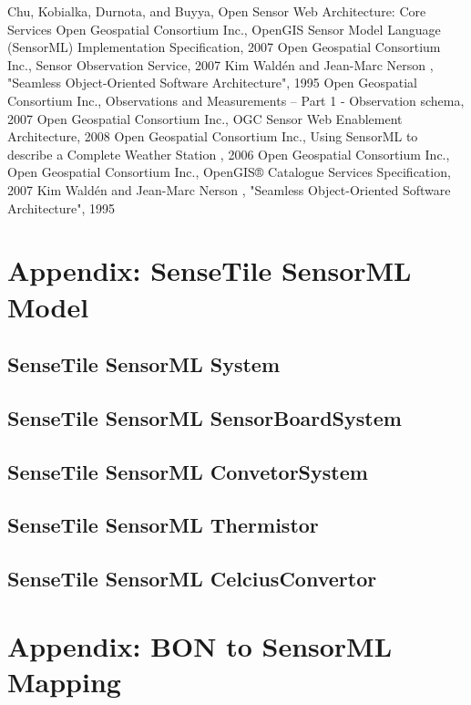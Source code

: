 \documentclass[]{final_report}
\begin{document}
\newpage
\begin{thebibliography}{99}
 Chu, Kobialka,  Durnota, and  Buyya, Open Sensor Web Architecture: Core Services
Open Geospatial Consortium Inc., OpenGIS Sensor Model Language (SensorML) Implementation Specification, 2007
Open Geospatial Consortium Inc.,  Sensor Observation Service, 2007
Kim Waldén and Jean-Marc Nerson , "Seamless Object-Oriented Software Architecture", 1995
Open Geospatial Consortium Inc., Observations and Measurements – Part 1 - Observation schema, 2007
Open Geospatial Consortium Inc., OGC Sensor Web Enablement Architecture, 2008
Open Geospatial Consortium Inc., Using SensorML to describe a
Complete Weather Station , 2006
Open Geospatial Consortium Inc.,
Open Geospatial Consortium Inc., OpenGIS® Catalogue Services Specification, 2007
Kim Waldén and Jean-Marc Nerson , "Seamless Object-Oriented Software Architecture", 1995
\end{thebibliography}



\appendix
\chapter{Appendix: SenseTile SensorML Model}
\section{SenseTile SensorML System}
\section{SenseTile SensorML SensorBoardSystem}
\section{SenseTile SensorML ConvetorSystem}
\section{SenseTile SensorML Thermistor}

\section{SenseTile SensorML CelciusConvertor}


\chapter{Appendix: BON to SensorML Mapping}\label{appenB}
\end{document}
